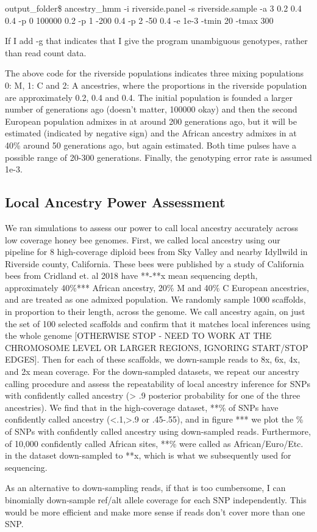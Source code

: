 \documentclass[12pt]{report}
\begin{document}
output\_folder\$ ancestry\_hmm -i riverside.panel -s riverside.sample -a 3 0.2 0.4 0.4 -p 0 100000 0.2 -p 1 -200 0.4 -p 2 -50 0.4 -e 1e-3 -tmin 20 -tmax 300 \par
If I add -g that indicates that I give the program unambiguous genotypes, rather than read count data.\par
The above code for the riverside populations indicates three mixing populations 0: M, 1: C and 2: A ancestries, where the proportions in the riverside population are approximately 0.2, 0.4 and 0.4. The initial population is founded a larger number of generations ago (doesn't matter, 100000 okay) and then the second European population admixes in at around 200 generations ago, but it will be estimated (indicated by negative sign) and the African ancestry admixes in at 40\% around 50 generations ago, but again estimated. Both time pulses have a possible range of 20-300 generations. Finally, the genotyping error rate is assumed 1e-3. \par

\subsection{Local Ancestry Power Assessment}
We ran simulations to assess our power to call local ancestry accurately across low coverage honey bee genomes. First, we called local ancestry using our pipeline for 8 high-coverage diploid bees from Sky Valley and nearby Idyllwild in Riverside county, California. These bees were published by a study of California bees from Cridland et. al 2018 have **-**x mean sequencing depth, approximately 40\%*** African ancestry, 20\% M and 40\% C European ancestries, and are treated as one admixed population. We randomly sample 1000 scaffolds, in proportion to their length, across the genome. We call ancestry again, on just the set of 100 selected scaffolds and confirm that it matches local inferences using the whole genome [OTHERWISE STOP - NEED TO WORK AT THE CHROMOSOME LEVEL OR LARGER REGIONS, IGNORING START/STOP EDGES]. Then for each of these scaffolds, we down-sample reads to 8x, 6x, 4x, and 2x mean coverage. For the down-sampled datasets, we repeat our ancestry calling procedure and assess the repeatability of local ancestry inference for SNPs with confidently called ancestry (> .9 posterior probability for one of the three ancestries). We find that in the high-coverage dataset, **\% of SNPs have confidently called ancestry (<.1,>.9 or .45-.55), and in figure *** we plot the \% of SNPs with confidently called ancestry using down-sampled reads. Furthermore, of 10,000 confidently called African sites, **\% were called as African/Euro/Etc. in the dataset down-sampled to **x, which is what we subsequently used for sequencing. \par
As an alternative to down-sampling reads, if that is too cumbersome, I can binomially down-sample ref/alt allele coverage for each SNP independently. This would be more efficient and make more sense if reads don't cover more than one SNP.
\end{document}
